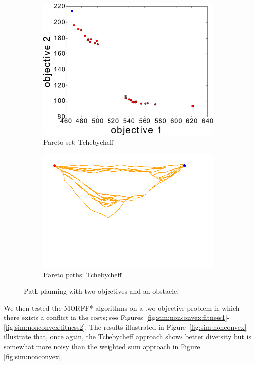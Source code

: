 \documentclass{article}
\begin{document}
\begin{figure}
\begin{subfigure}[b]{0.45\linewidth}
		\includegraphics[width=\textwidth]{fig/sim5-obstacle/PF05-MORRT2.pdf}
		\caption{Pareto set: Tchebycheff}
		\label{fig:sim:obs:pf:b}
	\end{subfigure} 
	\begin{subfigure}[b]{0.45\linewidth}
		\centering
		\includegraphics[width=\textwidth]{fig/sim5-obstacle/MORRTstar01-1-ALL.png}
		\caption{Pareto paths: Tchebycheff}
		\label{fig:sim:obs:sols:b}
	\end{subfigure}
	\caption{Path planning with two objectives and an obstacle.}
	\label{fig:sim:obs}
\end{figure}

We then tested the MORFF* algorithms on a two-objective problem  in which there exists a conflict in the costs; 
see Figures~\ref{fig:sim:nonconvex:fitness1}-\ref{fig:sim:nonconvex:fitness2}. 
The results illustrated in Figure~\ref{fig:sim:nonconvex} illustrate that, once again, the Tchebycheff approach shows better diversity but is somewhat more noisy than the weighted sum approach in Figure \ref{fig:sim:nonconvex}.
\end{document}
